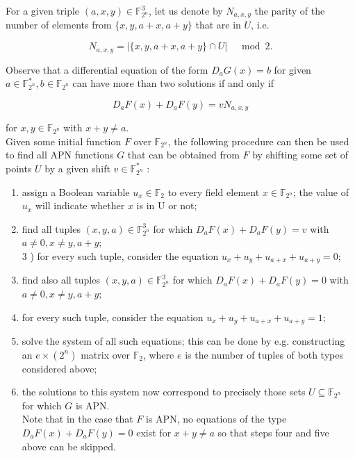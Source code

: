 \documentclass[10pt]{article}
\begin{document}
For a given triple $(a, x, y) \in \mathbb{F}_{2^{n}}^{3}$, let us denote by $N_{a, x, y}$ the parity of the number of elements from $\{x, y, a+x, a+y\}$ that are in $U$, i.e.

$$
N_{a, x, y}=|\{x, y, a+x, a+y\} \cap U| \quad \bmod 2 .
$$

Observe that a differential equation of the form $D_{a} G(x)=b$ for given $a \in \mathbb{F}_{2^{n}}^{*}, b \in \mathbb{F}_{2^{n}}$ can have more than two solutions if and only if

$$
D_{a} F(x)+D_{a} F(y)=v N_{a, x, y}
$$

for $x, y \in \mathbb{F}_{2^{n}}$ with $x+y \neq a$.\\
Given some initial function $F$ over $\mathbb{F}_{2^{n}}$, the following procedure can then be used to find all APN functions $G$ that can be obtained from $F$ by shifting some set of points $U$ by a given shift $v \in \mathbb{F}_{2^{n}}^{*}$ :

\begin{enumerate}
  \item assign a Boolean variable $u_{x} \in \mathbb{F}_{2}$ to every field element $x \in \mathbb{F}_{2^{n}}$; the value of $u_{x}$ will indicate whether $x$ is in U or not;
  \item find all tuples $(x, y, a) \in \mathbb{F}_{2^{n}}^{3}$ for which $D_{a} F(x)+ D_{a} F(y)=v$ with $a \neq 0, x \neq y, a+y ;$\\
3 ) for every such tuple, consider the equation $u_{x}+u_{y}+ u_{a+x}+u_{a+y}=0$;
  \item find also all tuples $(x, y, a) \in \mathbb{F}_{2^{n}}^{3}$ for which $D_{a} F(x)+ D_{a} F(y)=0$ with $a \neq 0, x \neq y, a+y ;$
  \item for every such tuple, consider the equation $u_{x}+u_{y}+ u_{a+x}+u_{a+y}=1$;
  \item solve the system of all such equations; this can be done by e.g. constructing an $e \times\left(2^{n}\right)$ matrix over $\mathbb{F}_{2}$, where $e$ is the number of tuples of both types considered above;
  \item the solutions to this system now correspond to precisely those sets $U \subseteq \mathbb{F}_{2^{n}}$ for which $G$ is APN.\\
Note that in the case that $F$ is APN, no equations of the type $D_{a} F(x)+D_{a} F(y)=0$ exist for $x+y \neq a$ so that steps four and five above can be skipped.
\end{enumerate}
\end{document}
